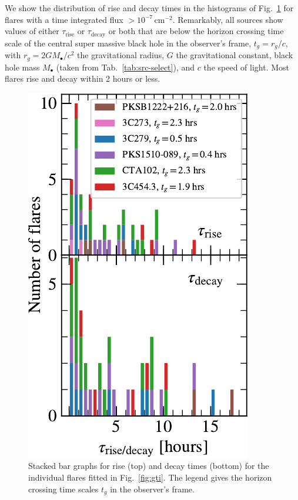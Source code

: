 \documentclass[twocolumn]{aastex62}
\begin{document}
We show the distribution of rise and decay times in the histograms of Fig.~\ref{fig:times-hist} for flares with a time integrated flux $>10^{-7}\,\mathrm{cm}^{-2}$. 
Remarkably, all sources show values of either $\tau_\mathrm{rise}$ or $\tau_\mathrm{decay}$ or both that are below the horizon crossing time scale of the central super massive black hole in the observer's frame, $t_g = r_g / c$, with $r_g = 2 G M_\bullet / c^2 $ the gravitational radius, $G$ the gravitational constant, black hole mass $M_\bullet$ (taken from Tab.~\ref{tab:src-select}), and $c$ the speed of light.
Most flares rise and decay within 2 hours or less. 
\begin{figure}
    \centering
    \includegraphics[width = .8\linewidth]{figures/lcfithop_results_tdtrhist_maxiter2_fsys0p00_addcomp0_orbit.pdf}
    \caption{Stacked bar graphs for  rise (top) and decay times (bottom) for the individual flares fitted in Fig.~\ref{fig:gti}. The legend gives the horizon crossing time scales $t_g$ in the observer's frame.}
    \label{fig:times-hist}
\end{figure}
\end{document}
